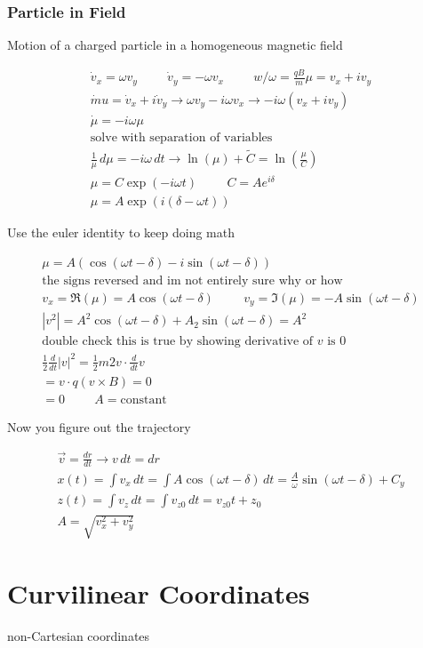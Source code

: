 \documentclass[fleqn]{report}
\newcommand{\hp}{\hspace{1cm}}
\newcommand{\equations} [1] {
\begin{gather*}
#1
\end{gather*}
}
\begin{document}
\subsection{Particle in Field}
Motion of a charged particle in a homogeneous magnetic field
\equations{
\dot v_x = \omega v_y
\hp 
\dot v_y = - \omega v_x
\hp
w / \omega = \frac{qB}{m}
\mu = v_x + i v_y
\\
\dot mu = \dot v_x + i \dot v_y
\longrightarrow
\omega v_y - i \omega v_x
\rightarrow
-i \omega (v_x + i v_y)
\\
\dot \mu = -i \omega \mu
\\
\textrm{solve with separation of variables}
\\
\frac{1}{\mu} \, d \mu = - i \omega \, dt
\rightarrow
\ln(\mu) + \tilde{C} = \ln(\frac{\mu}{C})
\\
\mu = C \exp(-i \omega t)
\hp
C = A e^{i \delta}
\\
\mu = A \exp(i(\delta - \omega t))
}
Use the euler identity to keep doing math
\equations{
	\mu = A(\cos(\omega t - \delta) - i \sin(\omega t - \delta))
	\\
	\textrm{the signs reversed and im not entirely sure why or how}
	\\
	v_x = \Re(\mu) = A \cos(\omega t - \delta)
	\hp
	v_y = \Im(\mu) = -A \sin(\omega t - \delta)
    \\
    |v^2| = A^2 \cos(\omega t - \delta) + A_2 \sin(\omega t - \delta)
    = A^2
    \\
    \textrm{double check this is true by 
    showing derivative of $v$ is 0}
    \\
    \frac{1}{2} \frac{d}{dt}|v|^2 = 
    \frac{1}{2}m 2v \cdot \frac{d}{dt}v
    \\
    = v \cdot q(v \times B) = 0
    \\
    = 0 \hp A = \textrm{constant}
}

Now you figure out the trajectory
\equations{
    \vec v = \frac{dr}{dt} \rightarrow v \, dt = dr 
    \\
    x(t) = \int v_x \, dt = \int A \cos(\omega t - \delta) \, dt 
    =
    \frac{A}{\omega} \sin(\omega t - \delta) + C_y
    \\
    z(t) = \int v_z \, dt = \int v_{z0} \, dt = 
    v_{z0} t + z_0
    \\
    A = \sqrt{v_x^2 + v_y^2}
}

\chapter{Curvilinear Coordinates}
non-Cartesian coordinates 
\end{document}
